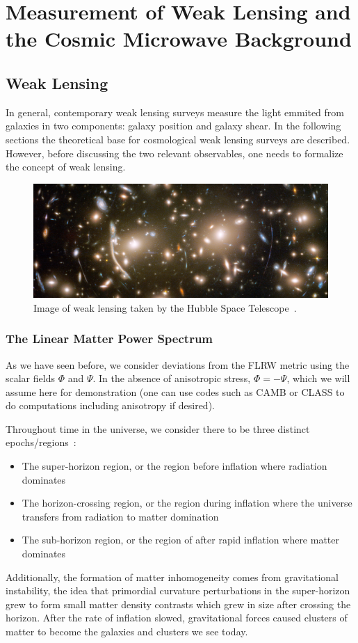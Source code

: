 \chapter{Measurement of Weak Lensing and the Cosmic Microwave Background}
\section{Weak Lensing}
In general, contemporary weak lensing surveys measure the light emmited from galaxies in two components: galaxy position and galaxy shear. In the following sections the theoretical base for cosmological weak lensing surveys are described. However, before discussing the two relevant observables, one needs to formalize the concept of weak lensing.
\begin{figure}[ht]
	\centering
	\includegraphics[width=\textwidth]{plots/hubble_weak_lensing.png}
	\caption{Image of weak lensing taken by the Hubble Space Telescope~\cite{hubble_lensing}.}
	\label{fig:weak_lensing}
\end{figure}
\subsection{The Linear Matter Power Spectrum}
As we have seen before, we consider deviations from the FLRW metric using the scalar fields $\Phi$ and $\Psi$. In the absence of anisotropic stress, $\Phi=-\Psi$, which we will assume here for demonstration (one can use codes such as CAMB or CLASS to do computations including anisotropy if desired). 

Throughout time in the universe, we consider there to be three distinct epochs/regions~\cite{scott_dodelson_modern_2021}:
\begin{itemize}
	\item The super-horizon region, or the region before inflation where radiation dominates
	\item The horizon-crossing region, or the region during inflation where the universe transfers from radiation to matter domination
	\item The sub-horizon region, or the region of after rapid inflation where matter dominates
\end{itemize}
Additionally, the formation of matter inhomogeneity comes from gravitational instability, the idea that primordial curvature perturbations in the super-horizon grew to form small matter density contrasts which grew in size after crossing the horizon. After the rate of inflation slowed, gravitational forces caused clusters of matter to become the galaxies and clusters we see today.

